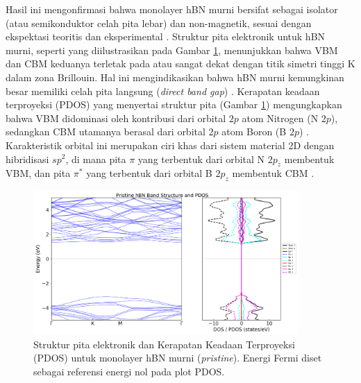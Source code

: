 Hasil ini mengonfirmasi bahwa monolayer hBN murni bersifat sebagai isolator (atau semikonduktor celah pita lebar) dan non-magnetik, sesuai dengan ekspektasi teoritis dan eksperimental \citep{Watanabe2004}. Struktur pita elektronik untuk hBN murni, seperti yang diilustrasikan pada Gambar \ref{fig:hbn_pristine_bs_pdos}, menunjukkan bahwa VBM dan CBM keduanya terletak pada atau sangat dekat dengan titik simetri tinggi K dalam zona Brillouin. Hal ini mengindikasikan bahwa hBN murni kemungkinan besar memiliki celah pita langsung (\textit{direct band gap}) . Kerapatan keadaan terproyeksi (PDOS) yang menyertai struktur pita (Gambar \ref{fig:hbn_pristine_bs_pdos}) mengungkapkan bahwa VBM didominasi oleh kontribusi dari orbital $2p$ atom Nitrogen (N $2p$), sedangkan CBM utamanya berasal dari orbital $2p$ atom Boron (B $2p$) . Karakteristik orbital ini merupakan ciri khas dari sistem material 2D dengan hibridisasi $sp^2$, di mana pita $\pi$ yang terbentuk dari orbital N $2p_z$ membentuk VBM, dan pita $\pi^*$ yang terbentuk dari orbital B $2p_z$ membentuk CBM \citep{sachs2011}. \begin{figure}[h!]
    \centering
    \includegraphics[width=0.9\textwidth]{gambar_hasil/simple_bands_pdos_pristine.png}
    \caption{Struktur pita elektronik dan Kerapatan Keadaan Terproyeksi (PDOS) untuk monolayer hBN murni (\textit{pristine}). Energi Fermi diset sebagai referensi energi nol pada plot PDOS.}
    \label{fig:hbn_pristine_bs_pdos}
\end{figure}

